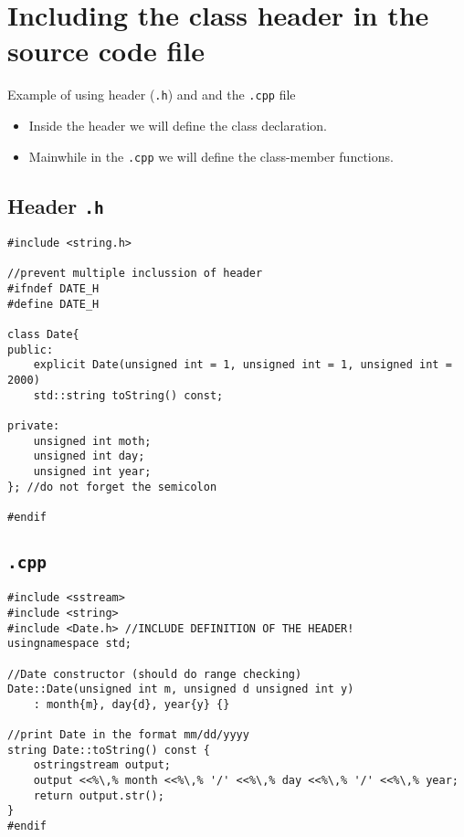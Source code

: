 \section{Including the class header in the source code file}
Example of using header (\texttt{.h}) and and the \texttt{.cpp} file\\
\begin{itemize}
    \item Inside the header we will define the class declaration.
    \item Mainwhile in the \texttt{.cpp} we will define the class-member functions.
\end{itemize}

\subsection{Header \texttt{.h}}
\begin{minipage}{.5\textwidth}
\end{minipage}\hspace{0.0cm}
\begin{minipage}{.8\textwidth}
\vspace{0.1cm}
\begin{lstlisting}[frame=tlrb,numbers=none,mathescape=true,escapechar=\%,columns=flexible]
#include <string.h>

//prevent multiple inclussion of header
#ifndef DATE_H
#define DATE_H

class Date{
public:
    explicit Date(unsigned int = 1, unsigned int = 1, unsigned int = 2000)
    std::string toString() const;
    
private:
    unsigned int moth;
    unsigned int day;
    unsigned int year;
}; //do not forget the semicolon

#endif
\end{lstlisting}
\end{minipage}

\subsection{\texttt{.cpp}}
\begin{minipage}{.5\textwidth}
\end{minipage}\hspace{0.0cm}
\begin{minipage}{.8\textwidth}
\vspace{0.1cm}
\begin{lstlisting}[frame=tlrb,numbers=none,mathescape=true,escapechar=\%,columns=flexible]
#include <sstream>
#include <string>
#include <Date.h> //INCLUDE DEFINITION OF THE HEADER!
usingnamespace std;

//Date constructor (should do range checking)
Date::Date(unsigned int m, unsigned d unsigned int y)
    : month{m}, day{d}, year{y} {}
    
//print Date in the format mm/dd/yyyy
string Date::toString() const {
    ostringstream output;
    output <<%\,% month <<%\,% '/' <<%\,% day <<%\,% '/' <<%\,% year;
    return output.str();
}
#endif
\end{lstlisting}
\end{minipage}


